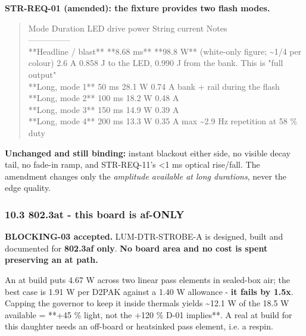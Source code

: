 \documentclass[11pt,a4paper]{article}
\begin{document}
\textbf{STR-REQ-01 (amended): the fixture provides two flash modes.}

\begin{quote}\small\ttfamily\raggedright
\textbar{} Mode \textbar{} Duration \textbar{} LED drive power \textbar{} String current \textbar{} Notes \textbar{}\\
\textbar{}---\textbar{}---\textbar{}---\textbar{}---\textbar{}---\textbar{}\\
\textbar{} {*}{*}Headline / blast{*}{*} \textbar{} {*}{*}8.68 ms{*}{*} \textbar{} {*}{*}98.8 W{*}{*} (white-only figure; \textasciitilde{}1/4 per colour) \textbar{} 2.6 A \textbar{} 0.858 J to the LED, 0.990 J from the bank. This is "full output" \textbar{}\\
\textbar{} {*}{*}Long, mode 1{*}{*} \textbar{} 50 ms \textbar{} 28.1 W \textbar{} 0.74 A \textbar{} bank + rail during the flash \textbar{}\\
\textbar{} {*}{*}Long, mode 2{*}{*} \textbar{} 100 ms \textbar{} 18.2 W \textbar{} 0.48 A \textbar{} \textbar{}\\
\textbar{} {*}{*}Long, mode 3{*}{*} \textbar{} 150 ms \textbar{} 14.9 W \textbar{} 0.39 A \textbar{} \textbar{}\\
\textbar{} {*}{*}Long, mode 4{*}{*} \textbar{} 200 ms \textbar{} 13.3 W \textbar{} 0.35 A \textbar{} max \textasciitilde{}2.9 Hz repetition at 58 \% duty \textbar{}
\end{quote}
\textbf{Unchanged and still binding:} instant blackout either side, no visible decay tail, no fade-in ramp, and STR-REQ-11's \textless{}1 ms optical rise/fall. The amendment changes only the \emph{amplitude available at long durations}, never the edge quality.

\subsubsection*{10.3 802.3at - this board is af-ONLY}
\textbf{BLOCKING-03 accepted.} LUM-DTR-STROBE-A is designed, built and documented for \textbf{802.3af only}. \textbf{No board area and no cost is spent preserving an at path.}

An at build puts 4.67 W across two linear pass elements in sealed-box air; the best case is 1.91 W per D2PAK against a 1.40 W allowance - \textbf{it fails by 1.5x}. Capping the governor to keep it inside thermals yields \textasciitilde{}12.1 W of the 18.5 W available = {*}{*}+45 \% light, not the +120 \% D-01 implies{*}{*}. A real at build for this daughter needs an off-board or heatsinked pass element, i.e. a respin.
\end{document}
